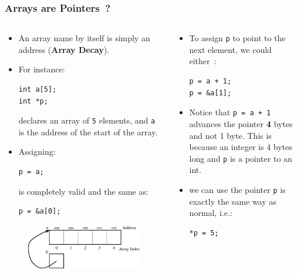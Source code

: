 

\begin{frame}[fragile]
\frametitle{Arrays are Pointers~?}
\begin{columns}[T]

\begin{column}{0.45\textwidth}
\begin{itemize}[<+->]
\item An array name by itself is simply an address
({\bf Array Decay}).

\item 
For instance:
\begin{verbatim}
int a[5];
int *p;
\end{verbatim}
declares an array of \verb^5^ elements, and
\verb^a^ is the address of the start of the
array.
\item
Assigning:
\begin{verbatim}
p = a;
\end{verbatim}
is completely valid and
the same as:
\begin{verbatim}
p = &a[0];
\end{verbatim}
\end{itemize}
\begin{center}
\begin{figure}[ht]
\centerline{
\includegraphics[scale=0.25]{../Figs/array9_2.eps}
}
\end{figure}
\end{center}
\end{column}


\pause
\begin{column}{0.45\textwidth}
\begin{itemize}[<+->]
\item To assign \verb^p^ to point to the next element,
we could either~:
\begin{verbatim}
p = a + 1;
p = &a[1];
\end{verbatim}
\item Notice that \verb^p = a + 1^ advances
the pointer {\bf 4} bytes and not 1 byte.
This is because an integer is 4 bytes long and
\verb^p^ is a pointer to an int.
\item we can use the pointer \verb^p^ is exactly
the same way as normal, i.e.:
\begin{verbatim}
*p = 5;
\end{verbatim}
\end{itemize}
\end{column}

\end{columns}
\end{frame}

